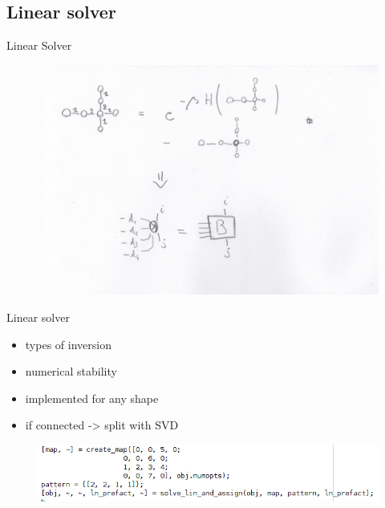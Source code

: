 \documentclass[aspectratio=169]{beamer}
\begin{document}
\subsection{Linear solver}

\begin{frame}{Linear Solver}
    \begin{figure}
        \includegraphics[scale=0.6]{Figures/linprob.pdf}
    \end{figure}
\end{frame}

\begin{frame}{Linear solver}
    \begin{itemize}
        \item types of inversion
        \item numerical stability
        \item implemented for any shape
        \item if connected -> split with SVD
    \end{itemize}

    \begin{figure}
        \includegraphics[scale=0.5]{Figures/mexample.png}
    \end{figure}

\end{frame}
\end{document}
